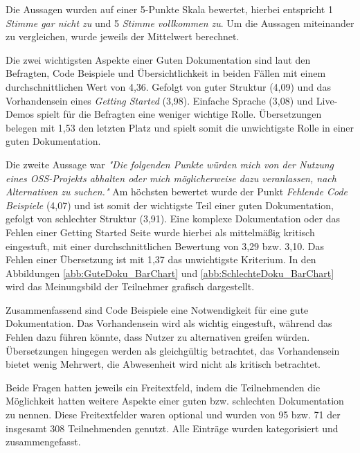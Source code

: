 \bigskip
\noindent
Die Aussagen wurden auf einer 5-Punkte Skala bewertet, hierbei entspricht 1 \textit{Stimme gar nicht zu}
und 5 \textit{Stimme vollkommen zu}. Um die Aussagen miteinander zu vergleichen, wurde jeweils der
Mittelwert berechnet.

Die zwei wichtigsten Aspekte einer Guten Dokumentation sind laut den Befragten, Code Beispiele und
Übersichtlichkeit in beiden Fällen mit einem durchschnittlichen Wert von 4,36. Gefolgt von guter 
Struktur (4,09) und
das Vorhandensein eines \textit{Getting Started} (3,98). Einfache Sprache (3,08) und Live-Demos spielt für
die Befragten eine weniger wichtige Rolle. 
Übersetzungen belegen mit 1,53 den letzten Platz und spielt somit die unwichtigste Rolle in einer 
guten Dokumentation. 


Die zweite Aussage war \textit{"Die folgenden Punkte würden mich von der Nutzung eines OSS-Projekts
    abhalten oder mich möglicherweise dazu veranlassen, nach Alternativen zu suchen."} Am höchsten bewertet
wurde der Punkt \textit{Fehlende Code Beispiele} (4,07) und ist somit der wichtigste Teil einer guten
Dokumentation, gefolgt von schlechter Struktur (3,91). 
Eine komplexe Dokumentation oder das Fehlen einer Getting Started Seite wurde hierbei als mittelmäßig kritisch 
eingestuft, mit einer durchschnittlichen Bewertung von 3,29 bzw. 3,10. Das Fehlen einer Übersetzung ist mit 1,37
das unwichtigste Kriterium.
In den Abbildungen \ref{abb:GuteDoku_BarChart} und
\ref{abb:SchlechteDoku_BarChart} wird das Meinungsbild der Teilnehmer grafisch dargestellt.

Zusammenfassend sind Code Beispiele eine Notwendigkeit für eine gute Dokumentation.
Das Vorhandensein wird als wichtig eingestuft, während das Fehlen dazu führen könnte, dass Nutzer
zu alternativen greifen würden. Übersetzungen hingegen werden als gleichgültig betrachtet, das
Vorhandensein bietet wenig Mehrwert, die Abwesenheit wird nicht als kritisch betrachtet.



\bigskip
\noindent
Beide Fragen hatten jeweils ein Freitextfeld, indem die Teilnehmenden die Möglichkeit hatten weitere
Aspekte einer guten bzw. schlechten Dokumentation zu nennen. Diese Freitextfelder waren optional und
wurden von 95 bzw. 71 der insgesamt 308 Teilnehmenden genutzt.
Alle Einträge wurden kategorisiert und zusammengefasst.

